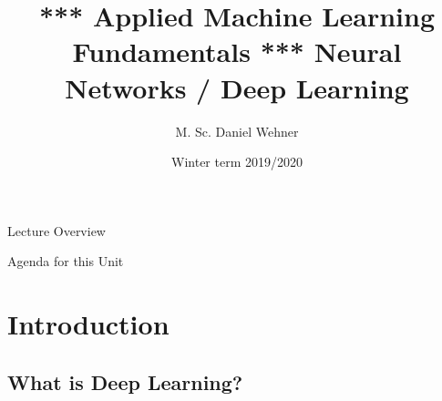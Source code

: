 


\title[Deep Learning]{*** Applied Machine Learning Fundamentals *** Neural Networks / Deep Learning}
\author{M. Sc. Daniel Wehner}
\date{Winter term 2019/2020}




\maketitlepage


\begin{frame}{Lecture Overview}{}
\end{frame}


\begin{frame}{Agenda for this Unit}
	\begin{multicols}{2}
		\tableofcontents
	\end{multicols}
\end{frame}


\section{Introduction}

\subsection{What is Deep Learning?}

